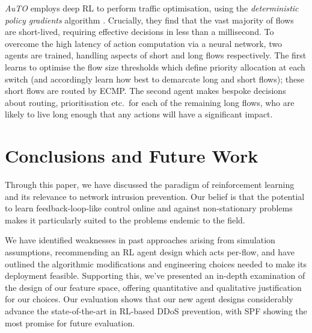 \documentclass[conference, letterpaper, 10pt, times]{IEEEtran}
\begin{document}
\emph{AuTO} \cite{DBLP:conf/sigcomm/ChenL0L18} employs deep RL to perform traffic optimisation, using the \emph{deterministic policy gradients} algorithm \cite{DBLP:conf/icml/SilverLHDWR14}.
Crucially, they find that the vast majority of flows are short-lived, requiring effective decisions in less than a millisecond.
To overcome the high latency of action computation via a neural network, two agents are trained, handling aspects of short and long flows respectively.
The first learns to optimise the flow size thresholds which define priority allocation at each switch (and accordingly learn how best to demarcate long and short flows); these short flows are routed by ECMP.
The second agent makes bespoke decisions about routing, prioritisation etc.\ for each of the remaining long flows, who are likely to live long enough that any actions will have a significant impact.



\section{Conclusions and Future Work}

Through this paper, we have discussed the paradigm of reinforcement learning and its relevance to network intrusion prevention.
Our belief is that the potential to learn feedback-loop-like control online and against non-stationary problems makes it particularly suited to the problems endemic to the field.

We have identified weaknesses in past approaches arising from simulation assumptions, recommending an RL agent design which acts per-flow, and have outlined the algorithmic modifications and engineering choices needed to make its deployment feasible.
Supporting this, we've presented an in-depth examination of the design of our feature space, offering quantitative and qualitative justification for our choices.
Our evaluation shows that our new agent designs considerably advance the state-of-the-art in RL-based DDoS prevention, with SPF showing the most promise for future evaluation.


\end{document}
